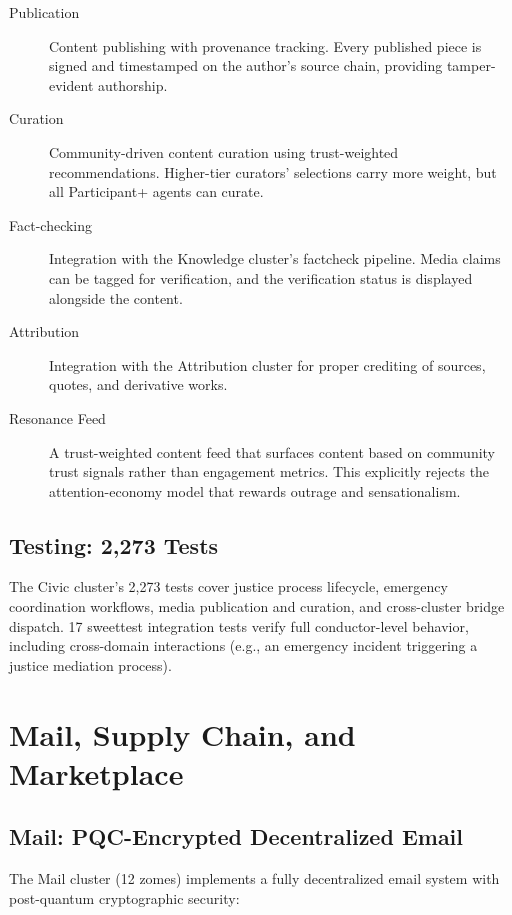 \documentclass[12pt]{book}
\begin{document}
\begin{description}
  \item[Publication] Content publishing with provenance tracking. Every
    published piece is signed and timestamped on the author's source
    chain, providing tamper-evident authorship.
  \item[Curation] Community-driven content curation using trust-weighted
    recommendations. Higher-tier curators' selections carry more weight,
    but all Participant+ agents can curate.
  \item[Fact-checking] Integration with the Knowledge cluster's factcheck
    pipeline. Media claims can be tagged for verification, and the
    verification status is displayed alongside the content.
  \item[Attribution] Integration with the Attribution cluster for proper
    crediting of sources, quotes, and derivative works.
  \item[Resonance Feed] A trust-weighted content feed that surfaces
    content based on community trust signals rather than engagement
    metrics. This explicitly rejects the attention-economy model that
    rewards outrage and sensationalism.
\end{description}

\section{Testing: 2,273 Tests}

The Civic cluster's 2,273 tests cover justice process lifecycle, emergency
coordination workflows, media publication and curation, and cross-cluster
bridge dispatch. 17 sweettest integration tests verify full conductor-level
behavior, including cross-domain interactions (e.g., an emergency incident
triggering a justice mediation process).


\chapter{Mail, Supply Chain, and Marketplace}

\section{Mail: PQC-Encrypted Decentralized Email}

The Mail cluster (12 zomes) implements a fully decentralized email system with
post-quantum cryptographic security:
\end{document}
